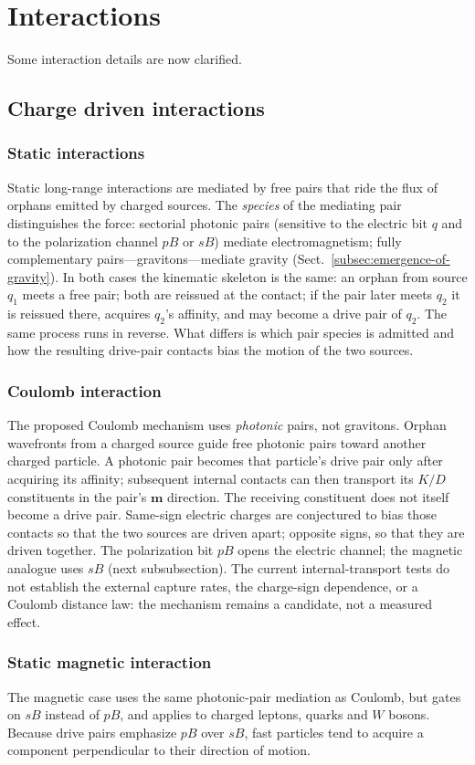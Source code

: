 \documentclass{ijuc}
\begin{document}
\section{Interactions\label{sec:Interactions}}
Some interaction details are now clarified.
\subsection{Charge driven interactions}
\subsubsection{Static interactions}
Static long-range interactions are mediated by free pairs that ride the flux of orphans emitted by charged sources. The \emph{species} of the mediating pair distinguishes the force: sectorial photonic pairs (sensitive to the electric bit $q$ and to the polarization channel $pB$ or $sB$) mediate electromagnetism; fully complementary pairs---gravitons---mediate gravity (Sect.~\ref{subsec:emergence-of-gravity}). In both cases the kinematic skeleton is the same: an orphan from source $q_1$ meets a free pair; both are reissued at the contact; if the pair later meets $q_2$ it is reissued there, acquires $q_2$'s affinity, and may become a drive pair of $q_2$. The same process runs in reverse. What differs is which pair species is admitted and how the resulting drive-pair contacts bias the motion of the two sources.
\subsubsection{Coulomb interaction} \label{subsec:Coulomb-interaction}
The proposed Coulomb mechanism uses \emph{photonic} pairs, not gravitons. Orphan wavefronts from a charged source guide free photonic pairs toward another charged particle. A photonic pair becomes that particle's drive pair only after acquiring its affinity; subsequent internal contacts can then transport its $K/D$ constituents in the pair's $\boldsymbol{m}$ direction. The receiving constituent does not itself become a drive pair. Same-sign electric charges are conjectured to bias those contacts so that the two sources are driven apart; opposite signs, so that they are driven together. The polarization bit $pB$ opens the electric channel; the magnetic analogue uses $sB$ (next subsubsection). The current internal-transport tests do not establish the external capture rates, the charge-sign dependence, or a Coulomb distance law: the mechanism remains a candidate, not a measured effect.
\subsubsection{Static magnetic interaction}
The magnetic case uses the same photonic-pair mediation as Coulomb, but gates on $sB$ instead of $pB$, and applies to charged leptons, quarks and $W$ bosons. Because drive pairs emphasize $pB$ over $sB$, fast particles tend to acquire a component perpendicular to their direction of motion.
\end{document}

